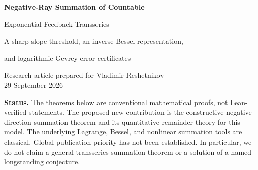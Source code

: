 \documentclass[11pt,a4paper]{article}
\numberwithin{equation}{section}
\theoremstyle{definition}
\theoremstyle{remark}
\newcommand{\U}{\widehat U}
\newcommand{\Q}{\widehat Q}
\newcommand{\Ree}{\operatorname{Re}}
\begin{document}
\begin{center}
{\LARGE\bfseries\color{ink} Negative-Ray Summation of Countable\par Exponential-Feedback Transseries\par}
\vspace{0.7em}
{\large A sharp slope threshold, an inverse Bessel representation,\par and logarithmic-Gevrey error certificates\par}
\vspace{0.9em}
Research article prepared for Vladimir Reshetnikov\\
29 September 2026
\end{center}

\begin{abstract}
Consider the formally well-defined feedback equation
\[
 \U(q)=\sum_{j\ge1}q^j\exp(\lambda_j\U(q)),\qquad \lambda_j\ge0,
\]
and its compositional inverse $\Q$.  We prove that $\U$ and $\Q$ are
\emph{finely Borel--Laplace summable in the negative direction} if and only
if $\lambda_j=O((j\log(j+1))^2)$.  The sums are inverse functions and recover
the literal feedback equation near the negative real axis.  The proof
inverts the feedback equation before taking its Borel transform: an exact
signed exponential-block expansion becomes a normally convergent sum of
Bessel kernels.  If
$A=\limsup\lambda_j/(j\log j)^2<\infty$, this constructs the inverse Borel
transform on the parabolic region
$|\zeta|+\Ree\zeta<1/(2A)$; for $A=0$ it constructs an entire function.
For the quadratic model $\lambda_j=j^2$, we additionally prove a uniform
remainder estimate on a closed left half-disc.  Its explicit positive
majorant $M_N$ satisfies
\[
 \log M_N=N\log N-2N\log\log N+(\log4-1)N+o(N).
\]
Truncation at $N\sim\log^2(1/r)/(4r)$ consequently gives an error at most
$\exp[-(1/4-o(1))\log^2(1/r)/r]$.  We provide exact rational numerical
certificates, an inverse-error transport bound, reproducible programs,
and a research agenda separating fine summability from angular summability,
resurgence, and actual optimal-error asymptotics.
\end{abstract}

\noindent\textbf{Status.} The theorems below are conventional mathematical proofs,
not Lean-verified statements.  The proposed new contribution is the constructive
negative-direction summation theorem and its quantitative remainder theory for
this model.  The underlying Lagrange, Bessel, and nonlinear summation tools are
classical.  Global publication priority has not been established.  In particular,
we do not claim a general transseries summation theorem or a solution of a named
longstanding conjecture.
\end{document}
